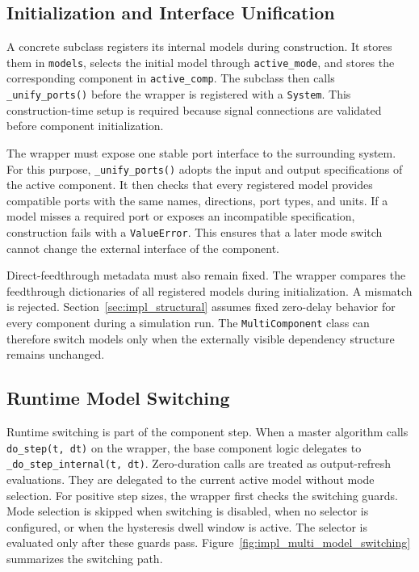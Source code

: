 \subsection{Initialization and Interface Unification}
\label{sec:impl_multi_model_initialization}

A concrete subclass registers its internal models during construction.
It stores them in \texttt{models}, selects the initial model through \texttt{active\_mode}, and stores the corresponding component in \texttt{active\_comp}.
The subclass then calls \texttt{\_unify\_ports()} before the wrapper is registered with a \texttt{System}.
This construction-time setup is required because signal connections are validated before component initialization.

The wrapper must expose one stable port interface to the surrounding system.
For this purpose, \texttt{\_unify\_ports()} adopts the input and output specifications of the active component.
It then checks that every registered model provides compatible ports with the same names, directions, port types, and units.
If a model misses a required port or exposes an incompatible specification, construction fails with a \texttt{ValueError}.
This ensures that a later mode switch cannot change the external interface of the component.

Direct-feedthrough metadata must also remain fixed.
The wrapper compares the feedthrough dictionaries of all registered models during initialization.
A mismatch is rejected.
Section~\ref{sec:impl_structural} assumes fixed zero-delay behavior for every component during a simulation run.
The \texttt{MultiComponent} class can therefore switch models only when the externally visible dependency structure remains unchanged.

\subsection{Runtime Model Switching}
\label{sec:impl_multi_model_switching}

Runtime switching is part of the component step.
When a master algorithm calls \texttt{do\_step(t, dt)} on the wrapper, the base component logic delegates to \texttt{\_do\_step\_internal(t, dt)}.
Zero-duration calls are treated as output-refresh evaluations.
They are delegated to the current active model without mode selection.
For positive step sizes, the wrapper first checks the switching guards.
Mode selection is skipped when switching is disabled, when no selector is configured, or when the hysteresis dwell window is active.
The selector is evaluated only after these guards pass.
Figure~\ref{fig:impl_multi_model_switching} summarizes the switching path.


